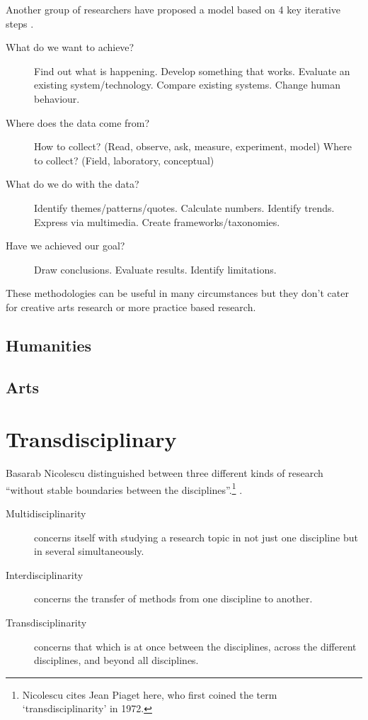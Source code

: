 Another group of researchers have proposed a model based on 4 key iterative steps \autocite{Holz2006}.

\begin{description}
  \item [What do we want to achieve?] Find out what is happening. Develop something that works. Evaluate an existing system/technology. Compare existing systems. Change human behaviour.
  \item [Where does the data come from?] How to collect? (Read, observe, ask, measure, experiment, model) Where to collect? (Field, laboratory, conceptual)
  \item [What do we do with the data?] Identify themes/patterns/quotes. Calculate numbers. Identify trends. Express via multimedia. Create frameworks/taxonomies.
  \item [Have we achieved our goal?] Draw conclusions. Evaluate results. Identify limitations.
\end{description}

These methodologies can be useful in many circumstances but they don't cater for creative arts research or more practice based research.


\subsection{Humanities}



\subsection{Arts}



\section{Transdisciplinary}

Basarab Nicolescu distinguished between three different kinds of research ``without stable boundaries between the disciplines''.\footnote{Nicolescu cites Jean Piaget here, who first coined the term `transdisciplinarity' in 1972.} \autocite{Nicolescu2010}.

\begin{description}
  \item [Multidisciplinarity]	concerns itself with studying a research topic in not just one discipline but in several simultaneously.
  \item [Interdisciplinarity]	concerns the transfer of methods from one discipline to another.
  \item [Transdisciplinarity]	concerns that which is at once between the disciplines, across the different disciplines, and beyond all disciplines.
\end{description}

